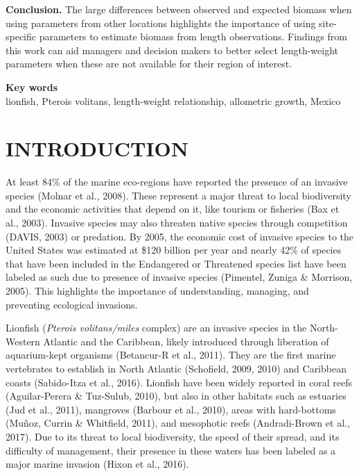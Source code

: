 \documentclass[12pt,]{article}
\begin{document}
\textbf{Conclusion.} The large differences between observed and expected
biomass when using parameters from other locations highlights the
importance of using site-specific parameters to estimate biomass from
length observations. Findings from this work can aid managers and
decision makers to better select length-weight parameters when these are
not available for their region of interest.

\textbf{Key words}\\
lionfish, Pterois volitans, length-weight relationship, allometric
growth, Mexico

\clearpage

\section{INTRODUCTION}\label{introduction}

At least 84\% of the marine eco-regions have reported the presence of an
invasive species (Molnar et al., 2008). These represent a major threat
to local biodiversity and the economic activities that depend on it,
like tourism or fisheries (Bax et al., 2003). Invasive species may also
threaten native species through competition (DAVIS, 2003) or predation.
By 2005, the economic cost of invasive species to the United States was
estimated at \$120 billion per year and nearly 42\% of species that have
been included in the Endangered or Threatened species list have been
labeled as such due to presence of invasive species (Pimentel, Zuniga \&
Morrison, 2005). This highlights the importance of understanding,
managing, and preventing ecological invasions.

Lionfish (\emph{Pterois volitans/miles} complex) are an invasive species
in the North-Western Atlantic and the Caribbean, likely introduced
through liberation of aquarium-kept organisms (Betancur-R et al., 2011).
They are the first marine vertebrates to establish in North Atlantic
(Schofield, 2009, 2010) and Caribbean coasts (Sabido-Itza et al., 2016).
Lionfish have been widely reported in coral reefs (Aguilar-Perera \&
Tuz-Sulub, 2010), but also in other habitats such as estuaries (Jud et
al., 2011), mangroves (Barbour et al., 2010), areas with hard-bottoms
(Muñoz, Currin \& Whitfield, 2011), and mesophotic reefs (Andradi-Brown
et al., 2017). Due to its threat to local biodiversity, the speed of
their spread, and its difficulty of management, their presence in these
waters has been labeled as a major marine invasion (Hixon et al., 2016).
\end{document}
